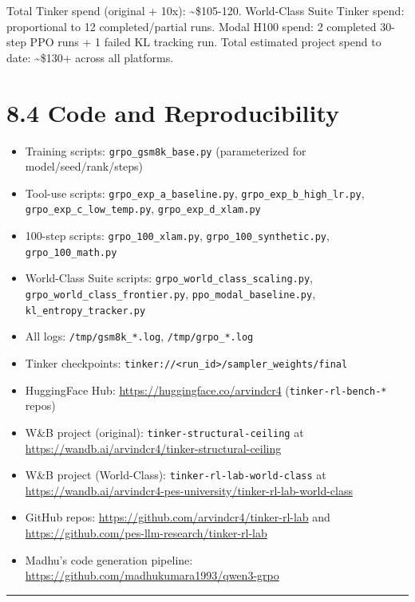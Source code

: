 \documentclass[
  american,
  11pt,
  a4paper,
  oneside]{report}
\providecommand{\tightlist}{%
  \setlength{\itemsep}{0pt}\setlength{\parskip}{0pt}}
\begin{document}
Total Tinker spend (original + 10x): \textasciitilde\$105-120.
World-Class Suite Tinker spend: proportional to 12 completed/partial
runs. Modal H100 spend: 2 completed 30-step PPO runs + 1 failed KL
tracking run. Total estimated project spend to date:
\textasciitilde\$130+ across all platforms.

\section{8.4 Code and Reproducibility}\label{code-and-reproducibility}

\begin{itemize}
\tightlist
\item
  Training scripts: \texttt{grpo\_gsm8k\_base.py} (parameterized for
  model/seed/rank/steps)
\item
  Tool-use scripts: \texttt{grpo\_exp\_a\_baseline.py},
  \texttt{grpo\_exp\_b\_high\_lr.py},
  \texttt{grpo\_exp\_c\_low\_temp.py}, \texttt{grpo\_exp\_d\_xlam.py}
\item
  100-step scripts: \texttt{grpo\_100\_xlam.py},
  \texttt{grpo\_100\_synthetic.py}, \texttt{grpo\_100\_math.py}
\item
  World-Class Suite scripts: \texttt{grpo\_world\_class\_scaling.py},
  \texttt{grpo\_world\_class\_frontier.py},
  \texttt{ppo\_modal\_baseline.py}, \texttt{kl\_entropy\_tracker.py}
\item
  All logs: \texttt{/tmp/gsm8k\_*.log}, \texttt{/tmp/grpo\_*.log}
\item
  Tinker checkpoints:
  \texttt{tinker://\textless{}run\_id\textgreater{}/sampler\_weights/final}
\item
  HuggingFace Hub: \url{https://huggingface.co/arvindcr4}
  (\texttt{tinker-rl-bench-*} repos)
\item
  W\&B project (original): \texttt{tinker-structural-ceiling} at
  \url{https://wandb.ai/arvindcr4/tinker-structural-ceiling}
\item
  W\&B project (World-Class): \texttt{tinker-rl-lab-world-class} at
  \url{https://wandb.ai/arvindcr4-pes-university/tinker-rl-lab-world-class}
\item
  GitHub repos: \url{https://github.com/arvindcr4/tinker-rl-lab} and
  \url{https://github.com/pes-llm-research/tinker-rl-lab}
\item
  Madhu's code generation pipeline:
  \url{https://github.com/madhukumara1993/qwen3-grpo}
\end{itemize}

\begin{center}\rule{0.5\linewidth}{0.5pt}\end{center}
\end{document}
